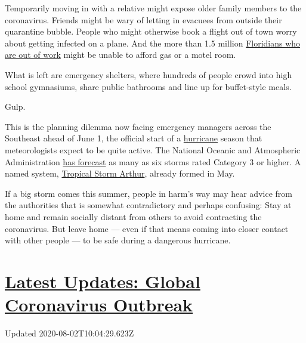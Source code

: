 Temporarily moving in with a relative might expose older family members
to the coronavirus. Friends might be wary of letting in evacuees from
outside their quarantine bubble. People who might otherwise book a
flight out of town worry about getting infected on a plane. And the more
than 1.5 million
\href{https://www.nytimes.com/2020/04/23/us/florida-coronavirus-unemployment.html}{Floridians
who are out of work} might be unable to afford gas or a motel room.

What is left are emergency shelters, where hundreds of people crowd into
high school gymnasiums, share public bathrooms and line up for
buffet-style meals.

Gulp.

This is the planning dilemma now facing emergency managers across the
Southeast ahead of June 1, the official start of a
\href{https://www.nytimes.com/interactive/2020/07/25/us/hurricane-hanna-tracker-map.html}{hurricane}
season that meteorologists expect to be quite active. The National
Oceanic and Atmospheric Administration
\href{https://www.nytimes.com/2020/05/21/climate/hurricane-season-2020-noaa.html}{has
forecast} as many as six storms rated Category 3 or higher. A named
system,
\href{https://www.nytimes.com/2020/05/17/us/tropical-storm-arthur-2020-path.html}{Tropical
Storm Arthur}, already formed in May.

If a big storm comes this summer, people in harm's way may hear advice
from the authorities that is somewhat contradictory and perhaps
confusing: Stay at home and remain socially distant from others to avoid
contracting the coronavirus. But leave home --- even if that means
coming into closer contact with other people --- to be safe during a
dangerous hurricane.

\hypertarget{latest-updates-global-coronavirus-outbreak}{%
\section{\texorpdfstring{\href{https://www.nytimes.com/2020/08/01/world/coronavirus-covid-19.html?action=click\&pgtype=Article\&state=default\&region=MAIN_CONTENT_1\&context=storylines_live_updates}{Latest
Updates: Global Coronavirus
Outbreak}}{Latest Updates: Global Coronavirus Outbreak}}\label{latest-updates-global-coronavirus-outbreak}}

Updated 2020-08-02T10:04:29.623Z

